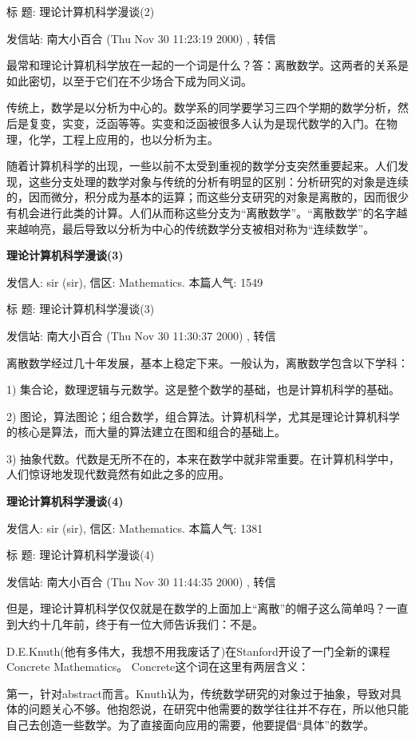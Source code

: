 标  题: 理论计算机科学漫谈(2)\cite{tcs2}

发信站: 南大小百合 (Thu Nov 30 11:23:19 2000) , 转信

最常和理论计算机科学放在一起的一个词是什么？答：离散数学。这两者的关系是如此密切，以至于它们在不少场合下成为同义词。

传统上，数学是以分析为中心的。数学系的同学要学习三四个学期的数学分析，然后是复变，实变，泛函等等。实变和泛函被很多人认为是现代数学的入门。在物理，化学，工程上应用的，也以分析为主。

随着计算机科学的出现，一些以前不太受到重视的数学分支突然重要起来。人们发现，这些分支处理的数学对象与传统的分析有明显的区别：分析研究的对象是连续的，因而微分，积分成为基本的运算；而这些分支研究的对象是离散的，因而很少有机会进行此类的计算。人们从而称这些分支为“离散数学”。“离散数学”的名字越来越响亮，最后导致以分析为中心的传统数学分支被相对称为“连续数学”。

\textbf{理论计算机科学漫谈(3)}


发信人: sir (sir), 信区: Mathematics. 本篇人气: 1549

标  题: 理论计算机科学漫谈(3)\cite{tcs3}

发信站: 南大小百合 (Thu Nov 30 11:30:37 2000) , 转信


离散数学经过几十年发展，基本上稳定下来。一般认为，离散数学包含以下学科：

1) 集合论，数理逻辑与元数学。这是整个数学的基础，也是计算机科学的基础。

2) 图论，算法图论；组合数学，组合算法。计算机科学，尤其是理论计算机科学的核心是算法，而大量的算法建立在图和组合的基础上。

3) 抽象代数。代数是无所不在的，本来在数学中就非常重要。在计算机科学中，人们惊讶地发现代数竟然有如此之多的应用。


\textbf{理论计算机科学漫谈(4)}

发信人: sir (sir), 信区: Mathematics. 本篇人气: 1381

标  题: 理论计算机科学漫谈(4)\cite{tcs4}

发信站: 南大小百合 (Thu Nov 30 11:44:35 2000) , 转信


但是，理论计算机科学仅仅就是在数学的上面加上“离散”的帽子这么简单吗？一直到大约十几年前，终于有一位大师告诉我们：不是。

D.E.Knuth(他有多伟大，我想不用我废话了)在Stanford开设了一门全新的课程Concrete Mathematics。 Concrete这个词在这里有两层含义：

第一，针对abstract而言。Knuth认为，传统数学研究的对象过于抽象，导致对具体的问题关心不够。他抱怨说，在研究中他需要的数学往往并不存在，所以他只能自己去创造一些数学。为了直接面向应用的需要，他要提倡“具体”的数学。

